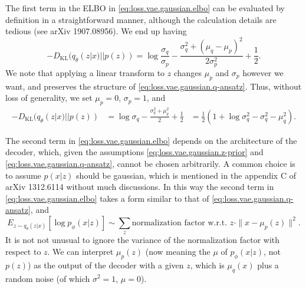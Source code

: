 \documentclass[hyperref, a4paper, 12pt]{report}
\def\\{}%
\def\mathbb#1{#1}%
\begin{document}
The first term in the ELBO in \eqref{eq:loss.vae.gaussian.elbo} can be evaluated by definition
in a straightforward manner, although the calculation details are tedious (see arXiv 1907.08956).
We end up having
\begin{equation}
    - D_{\text{KL}}(q_\theta(z|x) || p(z)) = \log \frac{\sigma_q}{\sigma_p} - \frac{\sigma_q^2 + (\mu_q - \mu_p)^2}{2 \sigma_p^2} + \frac{1}{2}.
\end{equation}
We note that applying a linear transform to $z$ changes $\mu_p$ and $\sigma_p$ however we want,
and preserves the structure of \eqref{eq:loss.vae.gaussian.q-ansatz}.
Thus, without loss of generality, we set $\mu_p = 0$, $\sigma_p = 1$,
and 
\begin{equation}
    \begin{aligned}
        - D_{\text{KL}}(q_\theta(z|x) || p(z)) &= \log \sigma_q - \frac{\sigma_q^2 + \mu_q^2}{2} + \frac{1}{2} \\
        &= \frac{1}{2} \left(
            1 + \log \sigma_q^2 - \sigma_q^2 - \mu_q^2
        \right).
    \end{aligned}
\end{equation}

The second term in \eqref{eq:loss.vae.gaussian.elbo} depends on the architecture of the decoder,
which, given the assumptions \eqref{eq:loss.vae.gaussian.z-prior} and \eqref{eq:loss.vae.gaussian.q-ansatz},
cannot be chosen arbitrarily.
A common choice is to assume $p(x|z)$ should be gaussian, which is mentioned in the appendix C of arXiv 1312.6114 without much discussions.
In this way the second term in \eqref{eq:loss.vae.gaussian.elbo} takes a form similar to that of \eqref{eq:loss.vae.gaussian.q-ansatz},
and 
\begin{equation}
    \mathbb{E}_{z \sim q_\theta(z|x)} [\log p_\phi (x|z)] \sim \sum_z
    \text{normalization factor w.r.t. $z$} \cdot \|x - \mu_p(z)\|^2.
\end{equation}
It is not not unusual to ignore the variance of the normalization factor with respect to $z$.
We can interpret $\mu_p(z)$ (now meaning the $\mu$ of $p_\phi(x|z)$, not $p(z)$) as the output of the decoder with a given $z$,
which is $\mu_q(x)$ plus a random noise (of which $\sigma^2 = 1$, $\mu = 0$).
\end{document}

